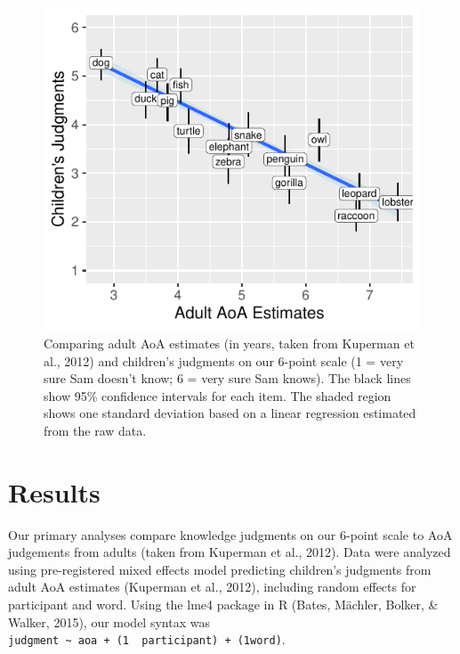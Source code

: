\documentclass[10pt, letterpaper]{article}
\newenvironment{CodeChunk}{}{}
\begin{document}
\begin{CodeChunk}
\begin{figure}[tb]
\includegraphics{figs/overall-1} \caption[Comparing adult AoA estimates (in years, taken from Kuperman et al., 2012) and children’s judgments on our 6-point scale (1 = very sure Sam doesn’t know]{Comparing adult AoA estimates (in years, taken from Kuperman et al., 2012) and children’s judgments on our 6-point scale (1 = very sure Sam doesn’t know; 6 = very sure Sam knows). The black lines show 95\% confidence intervals for each item. The shaded region shows one standard deviation based on a linear regression estimated from the raw data.}\label{fig:overall}
\end{figure}
\end{CodeChunk}

\hypertarget{results}{%
\section{Results}\label{results}}

Our primary analyses compare knowledge judgments on our 6-point scale to
AoA judgements from adults (taken from Kuperman et al., 2012). Data were
analyzed using pre-registered mixed effects model predicting children's
judgments from adult AoA estimates (Kuperman et al., 2012), including
random effects for participant and word. Using the lme4 package in R
(Bates, Mächler, Bolker, \& Walker, 2015), our model syntax was
\texttt{judgment\ \textasciitilde{}\ aoa\ +\ (1\ \textbar{}\ participant)\ +\ (1\textbar{}word)}.
\end{document}
